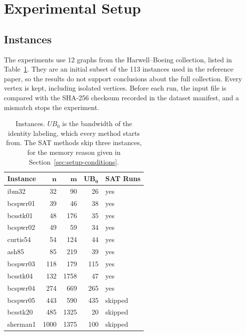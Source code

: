 
\section{Experimental Setup}\label{sec:setup}

\subsection{Instances}\label{sec:setup-instances}

The experiments use 12 graphs from the Harwell--Boeing collection, listed in Table~\ref{tab:setup-instances}. %
They are an initial subset of the 113 instances used in the reference paper, so the results do not support conclusions about the full collection. Every vertex is kept, including isolated vertices. Before each run, the input file is compared with the SHA-256 checksum recorded in the dataset manifest, and a mismatch stops the experiment.

\begin{table}[h]
\caption{Instances. $UB_0$ is the bandwidth of the identity labeling, which every method starts from. The SAT methods skip three instances, for the memory reason given in Section~\ref{sec:setup-conditions}.}
\label{tab:setup-instances}
\centering
\begin{tabular}{lrrrl}
\toprule
\textbf{Instance} & $\boldsymbol{n}$ & $\boldsymbol{m}$ & $\boldsymbol{UB_0}$ & \textbf{SAT Runs} \\
\midrule
ibm32 & 32 & 90 & 26 & yes \\
bcspwr01 & 39 & 46 & 38 & yes \\
bcsstk01 & 48 & 176 & 35 & yes \\
bcspwr02 & 49 & 59 & 34 & yes \\
curtis54 & 54 & 124 & 44 & yes \\
ash85 & 85 & 219 & 39 & yes \\
bcspwr03 & 118 & 179 & 115 & yes \\
bcsstk04 & 132 & 1758 & 47 & yes \\
bcspwr04 & 274 & 669 & 265 & yes \\
bcspwr05 & 443 & 590 & 435 & skipped \\
bcsstk20 & 485 & 1325 & 20 & skipped \\
sherman1 & 1000 & 1375 & 100 & skipped \\
\bottomrule
\end{tabular}
\end{table}

